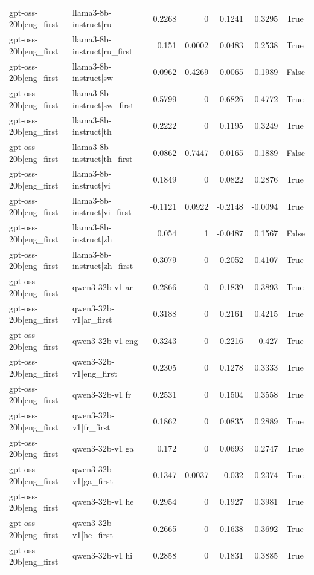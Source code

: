 \begin{table}
\begin{tabular}{l l r r r r l}
gpt-oss-20b|eng_first & llama3-8b-instruct|ru & 0.2268 & 0 & 0.1241 & 0.3295 & True \\
gpt-oss-20b|eng_first & llama3-8b-instruct|ru_first & 0.151 & 0.0002 & 0.0483 & 0.2538 & True \\
gpt-oss-20b|eng_first & llama3-8b-instruct|sw & 0.0962 & 0.4269 & -0.0065 & 0.1989 & False \\
gpt-oss-20b|eng_first & llama3-8b-instruct|sw_first & -0.5799 & 0 & -0.6826 & -0.4772 & True \\
gpt-oss-20b|eng_first & llama3-8b-instruct|th & 0.2222 & 0 & 0.1195 & 0.3249 & True \\
gpt-oss-20b|eng_first & llama3-8b-instruct|th_first & 0.0862 & 0.7447 & -0.0165 & 0.1889 & False \\
gpt-oss-20b|eng_first & llama3-8b-instruct|vi & 0.1849 & 0 & 0.0822 & 0.2876 & True \\
gpt-oss-20b|eng_first & llama3-8b-instruct|vi_first & -0.1121 & 0.0922 & -0.2148 & -0.0094 & True \\
gpt-oss-20b|eng_first & llama3-8b-instruct|zh & 0.054 & 1 & -0.0487 & 0.1567 & False \\
gpt-oss-20b|eng_first & llama3-8b-instruct|zh_first & 0.3079 & 0 & 0.2052 & 0.4107 & True \\
gpt-oss-20b|eng_first & qwen3-32b-v1|ar & 0.2866 & 0 & 0.1839 & 0.3893 & True \\
gpt-oss-20b|eng_first & qwen3-32b-v1|ar_first & 0.3188 & 0 & 0.2161 & 0.4215 & True \\
gpt-oss-20b|eng_first & qwen3-32b-v1|eng & 0.3243 & 0 & 0.2216 & 0.427 & True \\
gpt-oss-20b|eng_first & qwen3-32b-v1|eng_first & 0.2305 & 0 & 0.1278 & 0.3333 & True \\
gpt-oss-20b|eng_first & qwen3-32b-v1|fr & 0.2531 & 0 & 0.1504 & 0.3558 & True \\
gpt-oss-20b|eng_first & qwen3-32b-v1|fr_first & 0.1862 & 0 & 0.0835 & 0.2889 & True \\
gpt-oss-20b|eng_first & qwen3-32b-v1|ga & 0.172 & 0 & 0.0693 & 0.2747 & True \\
gpt-oss-20b|eng_first & qwen3-32b-v1|ga_first & 0.1347 & 0.0037 & 0.032 & 0.2374 & True \\
gpt-oss-20b|eng_first & qwen3-32b-v1|he & 0.2954 & 0 & 0.1927 & 0.3981 & True \\
gpt-oss-20b|eng_first & qwen3-32b-v1|he_first & 0.2665 & 0 & 0.1638 & 0.3692 & True \\
gpt-oss-20b|eng_first & qwen3-32b-v1|hi & 0.2858 & 0 & 0.1831 & 0.3885 & True \\

\end{tabular}
\end{table}
